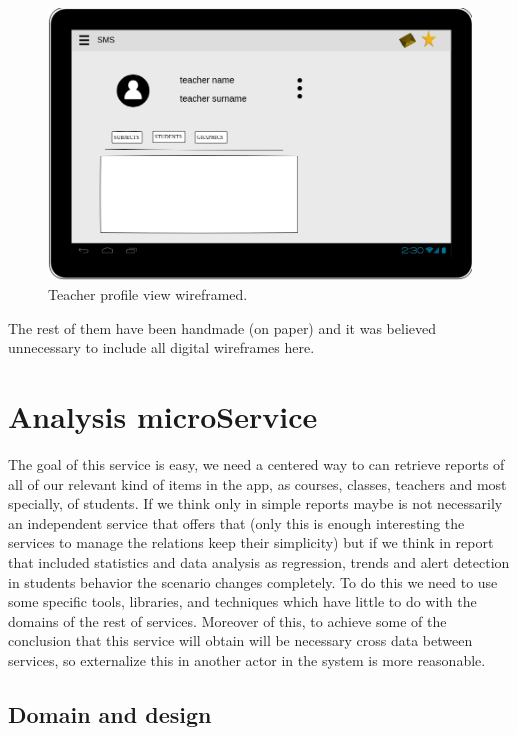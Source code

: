\begin{figure}[H]
  \includegraphics[scale=0.2]{img/snaps/teacher_profile_wireframe.png}
  \centering
  \caption{Teacher profile view wireframed.}
\end{figure}

\noindent The rest of them have been handmade (on paper) and it was believed unnecessary
to include all digital wireframes here.

\section{Analysis microService}

The goal of this service is easy, we need a centered way to can retrieve reports
of all of our relevant kind of items in the app, as courses, classes, teachers and
most specially, of students.
If we think only in simple reports maybe is not necessarily an independent service
that offers that (only this is enough interesting the services to manage the
relations keep their simplicity) but if we think in report that included statistics
and data analysis as regression, trends and alert detection in students behavior
the scenario changes completely.
\intro
To do this we need to use some specific tools,
libraries, and techniques which have little to do with  the domains of the rest
of services. Moreover of this, to achieve some of the conclusion that this service
will obtain will be necessary cross data between services, so externalize this in
another actor in the system is more reasonable.

\subsection{Domain and design}

